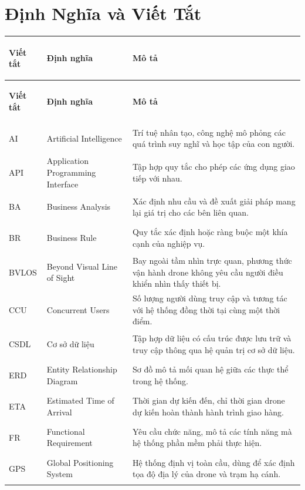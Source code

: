\chapter*{Định Nghĩa và Viết Tắt}
\begin{longtable}{|>{\bfseries\raggedright\arraybackslash}p{1.5cm}|>{\raggedright\arraybackslash}p{4.5cm}|>{\raggedright\arraybackslash}p{7.5cm}|}
  \hline
  \textbf{Viết tắt} & \textbf{Định nghĩa} & \textbf{Mô tả} \\
  \hline
  \endfirsthead
  \hline
  \textbf{Viết tắt} & \textbf{Định nghĩa} & \textbf{Mô tả} \\
  \hline
  \endhead
  AI    & Artificial Intelligence &
         Trí tuệ nhân tạo, công nghệ mô phỏng các quá trình suy nghĩ và học tập của con người. \\ \hline
  API   & Application Programming Interface &
         Tập hợp quy tắc cho phép các ứng dụng giao tiếp với nhau. \\ \hline
  BA    & Business Analysis &
         Xác định nhu cầu và đề xuất giải pháp mang lại giá trị cho các bên liên quan. \\ \hline
  BR    & Business Rule &
         Quy tắc xác định hoặc ràng buộc một khía cạnh của nghiệp vụ. \\ \hline
  BVLOS & Beyond Visual Line of Sight &
         Bay ngoài tầm nhìn trực quan, phương thức vận hành drone không yêu cầu người điều khiển nhìn thấy thiết bị. \\ \hline
  CCU   & Concurrent Users &
         Số lượng người dùng truy cập và tương tác với hệ thống đồng thời tại cùng một thời điểm. \\ \hline
  CSDL  & Cơ sở dữ liệu &
         Tập hợp dữ liệu có cấu trúc được lưu trữ và truy cập thông qua hệ quản trị cơ sở dữ liệu. \\ \hline
  ERD   & Entity Relationship Diagram &
         Sơ đồ mô tả mối quan hệ giữa các thực thể trong hệ thống. \\ \hline
  ETA   & Estimated Time of Arrival &
         Thời gian dự kiến đến, chỉ thời gian drone dự kiến hoàn thành hành trình giao hàng. \\ \hline
  FR    & Functional Requirement &
         Yêu cầu chức năng, mô tả các tính năng mà hệ thống phần mềm phải thực hiện. \\ \hline
  GPS   & Global Positioning System &
         Hệ thống định vị toàn cầu, dùng để xác định tọa độ địa lý của drone và trạm hạ cánh. \\ \hline

\end{longtable}
